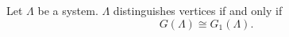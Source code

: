 Let $\Lambda$ be a system. $\Lambda$ distinguishes vertices if and only if
$$G(\Lambda) \cong G_1(\Lambda).$$
